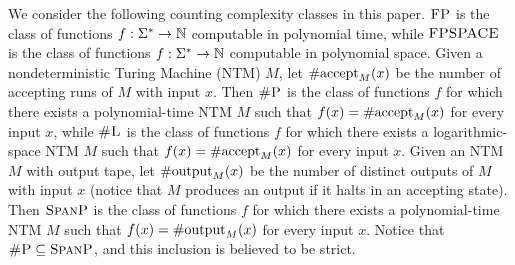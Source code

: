 We consider the following counting complexity classes in this paper. 
$\text{\sc FP}$ is the class of functions $f : \Sigma^* \to \mathbb{N}$ computable in polynomial time, while $\text{\sc FPSPACE}$ is the class of functions $f : \Sigma^* \to \mathbb{N}$ computable in polynomial space. 
Given a nondeterministic Turing Machine (NTM) $M$, let $\text{\rm \#accept}_M(x)$ be the number of accepting runs of $M$ with input $x$. Then $\text{\sc \#P}$ is the class of functions $f$ for which there exists a polynomial-time NTM $M$ such that $f(x) = \text{\rm \#accept}_M(x)$ for every input $x$, while $\text{\sc \#L}$ is the class of functions $f$ for which there exists a logarithmic-space NTM $M$ such that $f(x) = \text{\rm \#accept}_M(x)$ for every input $x$.  Given an NTM $M$ with output tape, let $\text{\rm \#output}_M(x)$ be the number of distinct outputs of $M$ with input $x$ (notice that  $M$ produces an output if it halts in an accepting state). Then $\text{\sc SpanP}$ is the  class of functions $f$ for which there exists a polynomial-time NTM $M$ such that $f(x) = \text{\rm \#output}_M(x)$ for every input $x$. Notice that $\text{\sc \#P} \subseteq \text{\sc SpanP}$, and this inclusion is believed to be strict. 



